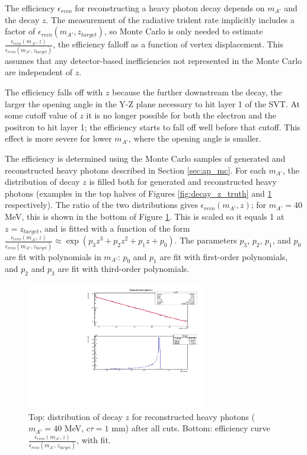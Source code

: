 The efficiency $\epsilon_{reco}$ for reconstructing a heavy photon decay depends on $m_{A'}$ and the decay $z$.
The measurement of the radiative trident rate implicitly includes a factor of $\epsilon_{reco}(m_{A'},z_{target})$, so Monte Carlo is only needed to estimate $\frac{\epsilon_{reco}(m_{A'},z)}{\epsilon_{reco}(m_{A'},z_{target})}$, the efficiency falloff as a function of vertex displacement.
This assumes that any detector-based inefficiencies not represented in the Monte Carlo are independent of $z$.

The efficiency falls off with $z$ because the further downstream the decay, the larger the opening angle in the Y-Z plane necessary to hit layer 1 of the SVT.
At some cutoff value of $z$ it is no longer possible for both the electron and the positron to hit layer 1; the efficiency starts to fall off well before that cutoff.
This effect is more severe for lower $m_{A'}$, where the opening angle is smaller.

The efficiency is determined using the Monte Carlo samples of generated and reconstructed heavy photons described in Section \ref{sec:ap_mc}.
For each $m_{A'}$, the distribution of decay $z$ is filled both for generated and reconstructed heavy photons (examples in the top halves of Figures \ref{fig:decay_z_truth} and \ref{fig:eff_z} respectively).
The ratio of the two distributions gives $\epsilon_{reco}(m_{A'},z)$; for $m_{A'}=40$ MeV, this is shown in the bottom of Figure \ref{fig:eff_z}.
This is scaled so it equals 1 at $z=z_{target}$, and is fitted with a function of the form $\frac{\epsilon_{reco}(m_{A'},z)}{\epsilon_{reco}(m_{A'},z_{target})} \approx \exp(p_3 z^3 + p_2 z^2 + p_1 z + p_0)$.
The parameters $p_3$, $p_2$, $p_1$, and $p_0$ are fit with polynomials in $m_{A'}$: $p_0$ and $p_1$ are fit with first-order polynomials, and $p_2$ and $p_3$ are fit with third-order polynomials.

\begin{figure}[ht]
\begin{center}
    \includegraphics[width=0.7\textwidth,page=2,angle=-90]{vertexing/figs/acceptance_40}
\end{center}
    \caption{Top: distribution of decay $z$ for reconstructed heavy photons ($m_{A'}=40$ MeV, $c\tau=1$ mm) after all cuts. Bottom: efficiency curve $\frac{\epsilon_{reco}(m_{A'},z)}{\epsilon_{reco}(m_{A'},z_{target})}$, with fit.}
    \label{fig:eff_z}
\end{figure}

